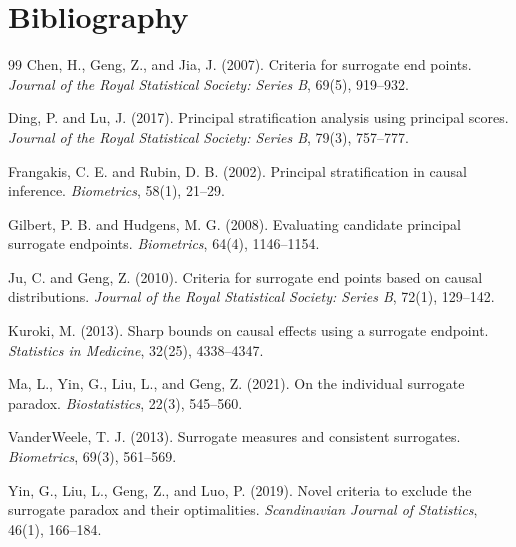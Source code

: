 \documentclass[11pt]{article}
\theoremstyle{definition}
\theoremstyle{plain}
\theoremstyle{remark}
\begin{document}
\section*{Bibliography}
\begin{thebibliography}{99}
Chen, H., Geng, Z., and Jia, J. (2007).
Criteria for surrogate end points.
\emph{Journal of the Royal Statistical Society: Series B}, 69(5), 919--932.

Ding, P. and Lu, J. (2017).
Principal stratification analysis using principal scores.
\emph{Journal of the Royal Statistical Society: Series B}, 79(3), 757--777.

Frangakis, C. E. and Rubin, D. B. (2002).
Principal stratification in causal inference.
\emph{Biometrics}, 58(1), 21--29.

Gilbert, P. B. and Hudgens, M. G. (2008).
Evaluating candidate principal surrogate endpoints.
\emph{Biometrics}, 64(4), 1146--1154.

Ju, C. and Geng, Z. (2010).
Criteria for surrogate end points based on causal distributions.
\emph{Journal of the Royal Statistical Society: Series B}, 72(1), 129--142.

Kuroki, M. (2013).
Sharp bounds on causal effects using a surrogate endpoint.
\emph{Statistics in Medicine}, 32(25), 4338--4347.

Ma, L., Yin, G., Liu, L., and Geng, Z. (2021).
On the individual surrogate paradox.
\emph{Biostatistics}, 22(3), 545--560.

VanderWeele, T. J. (2013).
Surrogate measures and consistent surrogates.
\emph{Biometrics}, 69(3), 561--569.

Yin, G., Liu, L., Geng, Z., and Luo, P. (2019).
Novel criteria to exclude the surrogate paradox and their optimalities.
\emph{Scandinavian Journal of Statistics}, 46(1), 166--184.
\end{thebibliography}
\end{document}
